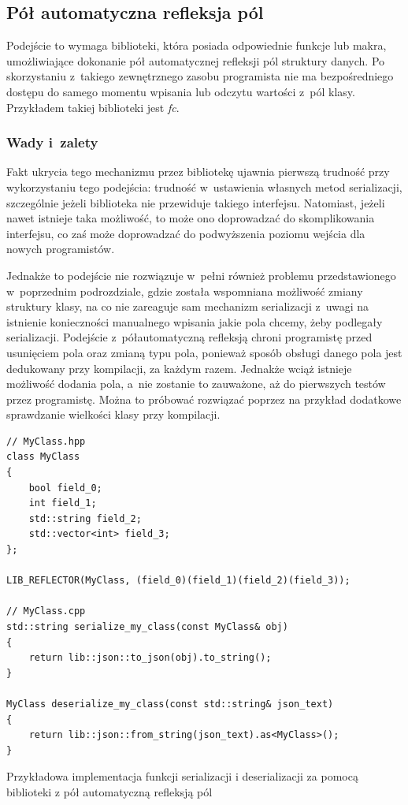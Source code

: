 \documentclass[12pt]{article}
\newcommand{\n}{\newline}
\newcommand{\nonpl}[1]{{\it #1}}
\begin{document}
{		{
			\subsection{Pół automatyczna refleksja pól}

			Podejście to wymaga biblioteki, która posiada odpowiednie funkcje lub makra, umożliwiające dokonanie pół automatycznej
			refleksji pól struktury danych. Po skorzystaniu z~takiego zewnętrznego zasobu programista nie ma bezpośredniego dostępu do samego momentu
			wpisania lub odczytu wartości z~pól klasy. Przykładem takiej biblioteki jest \nonpl{fc}\cite{fc_repo}.\n

			{
				\subsubsection{Wady i~zalety}

				Fakt ukrycia tego mechanizmu przez bibliotekę ujawnia pierwszą trudność przy wykorzystaniu tego podejścia: trudność w~ustawienia własnych
				metod serializacji, szczególnie jeżeli biblioteka nie przewiduje takiego interfejsu. Natomiast, jeżeli nawet istnieje taka możliwość,
				to może ono doprowadzać do skomplikowania interfejsu, co zaś może doprowadzać do podwyższenia poziomu wejścia dla nowych programistów.

				Jednakże to podejście nie rozwiązuje w~pełni również problemu przedstawionego w~poprzednim podrozdziale, gdzie została wspomniana
				możliwość zmiany struktury klasy, na co nie zareaguje sam mechanizm serializacji z~uwagi na istnienie
				konieczności manualnego wpisania jakie pola chcemy, żeby podlegały serializacji. Podejście z~półautomatyczną refleksją
				chroni programistę przed usunięciem pola oraz zmianą typu pola, ponieważ sposób obsługi danego pola jest dedukowany przy
				kompilacji, za każdym razem. Jednakże wciąż istnieje możliwość dodania pola, a~nie zostanie to zauważone, aż do pierwszych testów
				przez programistę. Można to próbować rozwiązać poprzez na przykład dodatkowe sprawdzanie wielkości klasy przy kompilacji.
			}

				\begin{captioned}[H]
					\begin{lstlisting}[frame=single]
// MyClass.hpp
class MyClass
{
	bool field_0;
	int field_1;
	std::string field_2;
	std::vector<int> field_3;
};

LIB_REFLECTOR(MyClass, (field_0)(field_1)(field_2)(field_3));

// MyClass.cpp
std::string serialize_my_class(const MyClass& obj)
{
	return lib::json::to_json(obj).to_string();
}

MyClass deserialize_my_class(const std::string& json_text)
{
	return lib::json::from_string(json_text).as<MyClass>();
}
					\end{lstlisting}
					\caption{Przykładowa implementacja funkcji serializacji i deserializacji za pomocą biblioteki z pół automatyczną refleksją pól}
					\label{half_automatic_example}
				\end{captioned}
			}
		}
\end{document}
